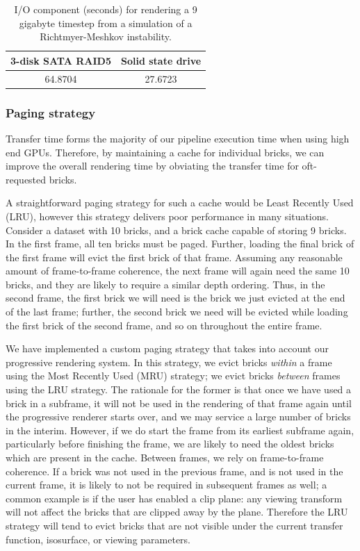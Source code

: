 \begin{table}
	\begin{center}
	\begin{tabular}{|c|c|}\hline
	\textbf{3-disk SATA RAID5} & \textbf{Solid state drive}\\\hline
	64.8704 & 27.6723\\\hline
	\end{tabular}
	\end{center}

  \caption{I/O component (seconds) for rendering a 9 gigabyte timestep
  from a simulation of a Richtmyer-Meshkov instability.}
	\label{tbl:ssd}
\end{table}

\subsubsection{Paging strategy}

Transfer time forms the majority of our pipeline execution time when
using high end GPUs. Therefore, by maintaining a cache for individual
bricks, we can improve the overall rendering time by obviating the
transfer time for oft-requested bricks.

A straightforward paging strategy for such a cache would
be Least Recently Used (LRU), however this strategy delivers
poor performance in many situations. Consider a dataset
with 10 bricks, and a brick cache capable of storing 9 bricks.
In the first frame, all ten bricks must be paged. Further, loading
the final brick of the first frame will evict the first brick
of that frame. Assuming any reasonable amount of frame-to-frame
coherence, the next frame will again need the same 10
bricks, and they are likely to require a similar depth ordering.
Thus, in the second frame, the first brick we will need
is the brick we just evicted at the end of the last frame; further,
the second brick we need will be evicted while loading
the first brick of the second frame, and so on throughout the
entire frame.

We have implemented a custom paging strategy that
takes into account our progressive rendering system. In this
strategy, we evict bricks \emph{within} a frame using the Most Recently
Used (MRU) strategy; we evict bricks \emph{between} frames using the
LRU strategy. The rationale for the former is that once we have used a
brick in a subframe, it will not be used in the rendering of that frame
again until the progressive renderer starts over, and we may service
a large number of bricks in the interim. However, if we do start the
frame from its earliest subframe again, particularly before finishing
the frame, we are likely to need the oldest bricks which are present
in the cache. Between frames, we rely on frame-to-frame coherence. If
a brick was not used in the previous frame, and is not used in the
current frame, it is likely to not be required in subsequent frames as
well; a common example is if the user has enabled a clip plane: any
viewing transform will not affect the bricks that are clipped away by
the plane. Therefore the LRU strategy will tend to evict bricks that
are not visible under the current transfer function, isosurface, or
viewing parameters.

